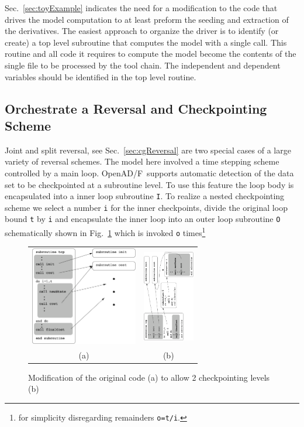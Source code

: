 \documentclass{book}
\newcommand{\OpenADF}{OpenAD/F}
\newcommand{\refsec}[1]{{Sec.~\ref{#1}}}
\newcommand{\reffig}[1]{{Fig.~\ref{#1}}}
\begin{document}
\refsec{sec:toyExample} indicates the need for a modification 
to the code that drives the model computation to at least 
preform the seeding and extraction of the derivatives. 
The easiest approach to organize the driver is to identify (or create) 
a top level subroutine that computes the model with a single call. 
This routine and all code it requires to compute the model 
become the contents of the single file to be processed by the tool chain.
The independent and dependent variables should be identified in the top level routine.  

\subsection{Orchestrate a Reversal and Checkpointing Scheme}
Joint and split reversal, see \refsec{sec:cgReversal} are two special cases 
of a large variety of reversal schemes. The model here involved a time stepping 
scheme controlled by a main loop. \OpenADF\ supports automatic detection of the 
data set to be checkpointed at a subroutine level. To use this feature the loop 
body is encapsulated into a inner loop subroutine \lstinline{I}. To realize a nested checkpointing scheme
we select a number \lstinline{i} for the inner checkpoints, 
divide the original loop bound \lstinline{t} by \lstinline{i} and encapsulate the inner loop 
into an outer loop subroutine \lstinline{O} schematically shown in \reffig{fig:checkpointLoops} 
which is invoked \lstinline{o} times\footnote{
for simplicity disregarding remainders \lstinline{o=t/i}.
}
\begin{figure}
\begin{tabular}{cc}
\begin{minipage}{5cm}
\includegraphics[height=4.3cm]{checkpointLoops}
\end{minipage}
&
\begin{minipage}{6cm}
\includegraphics[height=4cm]{checkpointLoopsNew2}
\end{minipage}\\
(a)& (b)
\end{tabular}
\caption{Modification of the original code (a) to allow 2 checkpointing levels (b)}\label{fig:checkpointLoops}
\end{figure}
\end{document}
